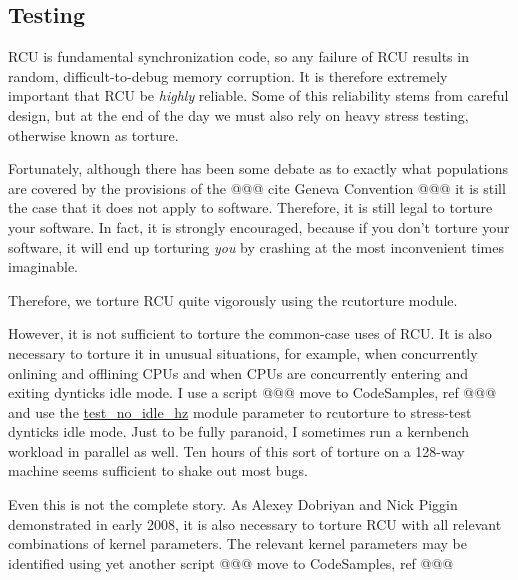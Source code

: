 \subsection{Testing}
\label{app:rcuimpl:rcutree:Testing}

RCU is fundamental synchronization code, so any failure of RCU
results in random, difficult-to-debug memory corruption.
It is therefore extremely important that RCU be \emph{highly} reliable.
Some of this reliability stems from careful design, but at the
end of the day we must also rely on heavy stress testing, otherwise
known as torture.

Fortunately, although there has been some debate as to exactly
what populations are covered by the provisions of the
@@@ cite Geneva Convention @@@
it is still the case that it does not apply to software.
Therefore, it is still legal to torture your software.
In fact, it is strongly encouraged, because if you don't torture your
software, it will end up torturing \emph{you} by crashing at the most
inconvenient times imaginable.

Therefore, we torture RCU quite vigorously using the rcutorture module.

However, it is not sufficient to torture the common-case uses of RCU.
It is also necessary to torture it in unusual situations, for example,
when concurrently onlining and offlining CPUs and when CPUs are concurrently
entering and exiting dynticks idle mode.
I use a script @@@ move to CodeSamples, ref @@@
and use the \url{test_no_idle_hz} module parameter to rcutorture
to stress-test dynticks idle mode.
Just to be fully paranoid, I sometimes run a kernbench workload in parallel
as well.
Ten hours of this sort of torture on a 128-way machine seems sufficient
to shake out most bugs.

Even this is not the complete story.
As Alexey Dobriyan and Nick Piggin demonstrated in early 2008, it is
also necessary to torture RCU with all relevant combinations of kernel
parameters.
The relevant kernel parameters may be identified using yet another
script @@@ move to CodeSamples, ref @@@

